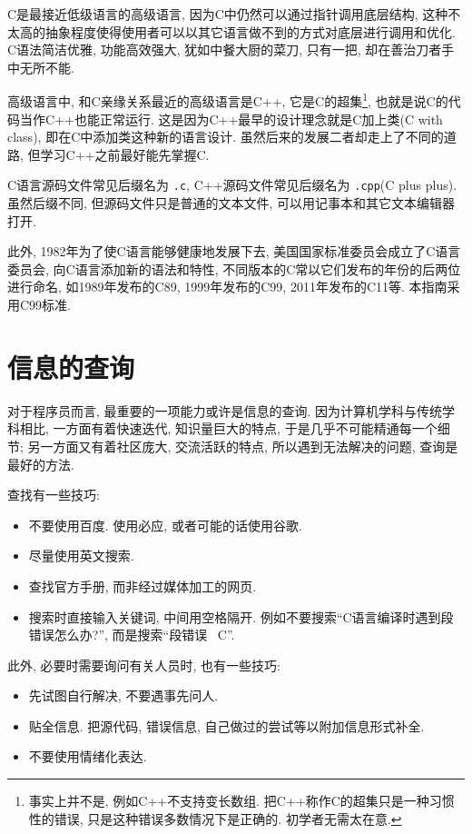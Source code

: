         C是最接近低级语言的高级语言, 因为C中仍然可以通过指针调用底层结构, 这种不太高的抽象程度使得使用者可以以其它语言做不到的方式对底层进行调用和优化. C语法简洁优雅, 功能高效强大, 犹如中餐大厨的菜刀, 只有一把, 却在善治刀者手中无所不能.

        高级语言中, 和C亲缘关系最近的高级语言是C++, 它是C的超集\footnote{事实上并不是, 例如C++不支持变长数组. 把C++称作C的超集只是一种习惯性的错误, 只是这种错误多数情况下是正确的. 初学者无需太在意.}, 也就是说C的代码当作C++也能正常运行. 这是因为C++最早的设计理念就是C加上类(C with class), 即在C中添加类这种新的语言设计. 虽然后来的发展二者却走上了不同的道路, 但学习C++之前最好能先掌握C.

        C语言源码文件常见后缀名为 \texttt{.c}, C++源码文件常见后缀名为 \texttt{.cpp}(C plus plus). 虽然后缀不同, 但源码文件只是普通的文本文件, 可以用记事本和其它文本编辑器打开.

        此外, 1982年为了使C语言能够健康地发展下去, 美国国家标准委员会成立了C语言委员会, 向C语言添加新的语法和特性, 不同版本的C常以它们发布的年份的后两位进行命名, 如1989年发布的C89, 1999年发布的C99, 2011年发布的C11等. 本指南采用C99标准.

    \section{信息的查询} \label{信息的查询}
        对于程序员而言, 最重要的一项能力或许是信息的查询. 因为计算机学科与传统学科相比, 一方面有着快速迭代, 知识量巨大的特点, 于是几乎不可能精通每一个细节; 另一方面又有着社区庞大, 交流活跃的特点, 所以遇到无法解决的问题, 查询是最好的方法.

        查找有一些技巧:
        \vspace*{-13pt}
        \begin{itemize}
            \item 不要使用百度. 使用必应, 或者可能的话使用谷歌.
            \item 尽量使用英文搜索.
            \item 查找官方手册, 而非经过媒体加工的网页.
            \item 搜索时直接输入关键词, 中间用空格隔开. 例如不要搜索``C语言编译时遇到段错误怎么办?'', 而是搜索``段错误 \ C''.
        \end{itemize}

        此外, 必要时需要询问有关人员时, 也有一些技巧:
        \vspace*{-13pt}
        \begin{itemize}
            \item 先试图自行解决, 不要遇事先问人.
            \item 贴全信息. 把源代码, 错误信息, 自己做过的尝试等以附加信息形式补全.
            \item 不要使用情绪化表达. 
        \end{itemize}

